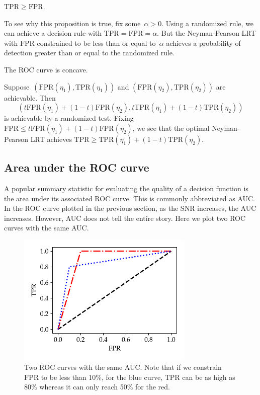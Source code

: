 \documentclass{tufte-book}
\begin{document}
\begin{Proposition}

\(\mathrm{TPR} \geq \mathrm{FPR}\).

\end{Proposition}

To see why this proposition is true, fix some~\(\alpha>0\). Using a
randomized rule, we can achieve a decision rule with
\(\mathrm{TPR}=\mathrm{FPR}=\alpha\). But the Neyman-Pearson LRT with
\(\mathrm{FPR}\) constrained to be less than or equal to~\(\alpha\)
achieves a probability of detection greater than or equal to the
randomized rule.

\begin{Proposition}

The ROC curve is concave.

\end{Proposition}

Suppose~\((\mathrm{FPR}(\eta_1),\mathrm{TPR}(\eta_1))\) and
\((\mathrm{FPR}(\eta_2),\mathrm{TPR}(\eta_2))\) are achievable. Then \[
    (t\mathrm{FPR}(\eta_1)+(1-t)\mathrm{FPR}(\eta_2) ,t \mathrm{TPR}(\eta_1)+(1-t)\mathrm{TPR}(\eta_2))
\] is achievable by a randomized test. Fixing
\(\mathrm{FPR} \leq t\mathrm{FPR}(\eta_1)+(1-t)\mathrm{FPR}(\eta_2)\),
we see that the optimal Neyman-Pearson LRT achieves
\(\mathrm{TPR} \geq \mathrm{TPR}(\eta_1)+(1-t)\mathrm{TPR}(\eta_2)\).

\hypertarget{area-under-the-roc-curve}{%
\subsection{Area under the ROC curve}\label{area-under-the-roc-curve}}

A popular summary statistic for evaluating the quality of a decision
function is the area under its associated ROC curve. This is commonly
abbreviated as AUC. In the ROC curve plotted in the previous section, as
the SNR increases, the AUC increases. However, AUC does not tell the
entire story. Here we plot two ROC curves with the same AUC.

\begin{figure}
\centering
\includegraphics[width=0.75\textwidth,height=\textheight]{assets/equal_auc}
\caption{Two ROC curves with the same AUC. Note that if we constrain
\(\mathrm{FPR}\) to be less than 10\%, for the blue curve,
\(\mathrm{TPR}\) can be as high as 80\% whereas it can only reach 50\%
for the red.}
\end{figure}
\end{document}
